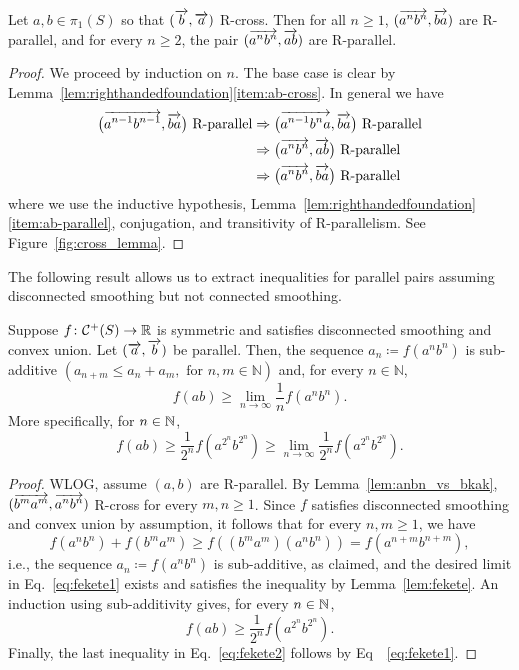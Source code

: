 \begin{lemma} 
  Let $a,b \in \pi_1(S)$ so that $(\overrightarrow{b},\overrightarrow{a})$ R-cross. Then for all
  $n \ge 1$, $(\overrightarrow{a^n
  b^n},\overrightarrow{ba})$ are R-parallel, and for every $n \geq 2$, the pair $(\overrightarrow{a^n
  b^n},\overrightarrow{ab})$ are R-parallel.
\label{lem:anbn_vs_bkak_parallel}
\end{lemma}
\begin{proof}
We proceed by induction on $n$. The base case is clear by
Lemma~\ref{lem:righthandedfoundation}\ref{item:ab-cross}.
In general we have
\begin{align*}
  \bigl(\overrightarrow{a^{n-1}b^{n-1}},\overrightarrow{ba}\bigr)\text{ R-parallel}
  &\Rightarrow
    \bigl(\overrightarrow{a^{n-1}b^n a}, \overrightarrow{ba}\bigr)\text{ R-parallel}\\
  &\Rightarrow
    \bigl(\overrightarrow{a^nb^n}, \overrightarrow{ab}\bigr)\text{ R-parallel}\\
  &\Rightarrow
    \bigl(\overrightarrow{a^nb^n}, \overrightarrow{ba}\bigr)\text{ R-parallel}
\end{align*}
where we use the inductive hypothesis,
Lemma~\ref{lem:righthandedfoundation}\ref{item:ab-parallel},
conjugation, and transitivity of R\hyp parallelism. See
Figure~\ref{fig:cross_lemma}.
\end{proof}

The following result allows us to extract inequalities for parallel pairs assuming disconnected smoothing but not connected smoothing.
\begin{lemma}
\label{lem:fekete_upper}
Suppose $f \colon \mathcal{C}^+(S) \to \mathbb{R}$ is symmetric and satisfies disconnected smoothing and convex union. Let $(\overrightarrow{a},\overrightarrow{b})$ be parallel.
Then, the sequence $a_n \coloneqq f(a^nb^n)$ is sub-additive $(a_{n+m}
\leq a_n + a_m, \text{ for } n,m \in \mathbb{N})$ and, for every $n \in \mathbb{N}$,
\begin{equation}
\label{eq:fekete1}
f(ab) \geq \lim_{n\to\infty} \frac{1}{n} f(a^nb^n).
\end{equation}
%
More specifically, for $n \in \mathbb{N}$,
\begin{equation}
\label{eq:fekete2}
f(ab) \geq \frac{1}{2^n} f(a^{2^n}b^{2^n}) \geq \lim_{n \to \infty} \frac{1}{2^n} f(a^{2^n}b^{2^n}).
\end{equation}
\end{lemma}
\begin{proof}
WLOG, assume $(a,b)$ are R-parallel. By Lemma~\ref{lem:anbn_vs_bkak}, $(\overrightarrow{b^m a^m}, \overrightarrow{a^nb^n})$ R-cross for every $m,n \geq 1$.
Since $f$ satisfies disconnected smoothing and convex union by assumption, it follows that for every $n,m \geq 1$, we have
\[
f(a^n b^n) + f(b^m a^m) \geq f((b^m a^m)(a^n b^n)) = f(a^{n+m}b^{n+m}),
\]
i.e., the sequence $a_n \coloneqq f(a^n b^n)$ is sub-additive, as claimed, and the desired limit in Eq.~\eqref{eq:fekete1} exists and satisfies the inequality by Lemma~\ref{lem:fekete}.
An induction using sub-additivity gives, for every $n \in \mathbb{N}$,
\[
f(ab) \geq \frac{1}{2^n} f(a^{2^n}b^{2^n}).
\]
Finally, the last inequality in Eq.~\eqref{eq:fekete2} follows by Eq~~\eqref{eq:fekete1}.
\end{proof}



